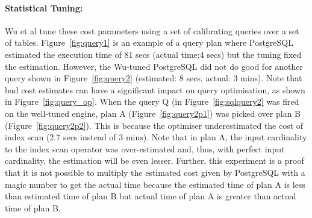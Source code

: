\documentclass{article}
\begin{document}
\begin{multicols}{2}
	 \paragraph*{Statistical Tuning:} Wu et al \cite{wu} tune these cost parameters using a set of calibrating queries over a set of tables. Figure~\ref{fig:query1} is an example of a query plan where PostgreSQL estimated the execution time of 81 secs (actual time:4 secs) but the tuning fixed the estimation. However, the Wu-tuned PostgreSQL did not do good for another query shown in Figure~\ref{fig:query2} (estimated: 8 secs, actual: 3 mins). Note that bad cost estimates can have a significant impact on query optimisation, as shown in Figure~\ref{fig:query_op}. When the query Q (in Figure~\ref{fig:sqlquery2} was fired on the well-tuned engine, plan A (Figure~\ref{fig:query2p1}) was picked over plan B (Figure~\ref{fig:query2p2}). This is because the optimiser underestimated the cost of index scan (2.7 secs instead of 3 mins). Note that in plan A, the input cardinality to the index scan operator was over-estimated and, thus, with perfect input cardinality, the estimation will be even lesser. Further, this experiment is a proof that it is not possible to multiply the estimated cost given by PostgreSQL with a magic number to get the actual time because the estimated time of plan A is less than estimated time of plan B but actual time of plan A is greater than actual time of plan B.
\end{multicols}
\end{document}
